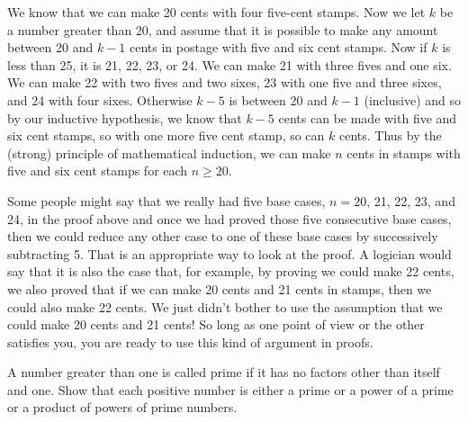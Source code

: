 We know that  we can make 20 cents
with four five-cent stamps.  Now we let $k$ be a number greater than 20,
and assume that it is possible to make any amount between 20 and $k-1$
cents in postage with five and six cent stamps.  Now if $k$ is less than
25, it is 21, 22, 23, or 24.  We can make 21 with three fives and one
six.  We can make 22 with two fives and two sixes, 23 with one five and
three sixes, and 24 with four sixes.  Otherwise $k-5$ is  between 20 and
$k-1$ (inclusive) and so by our inductive hypothesis, we know that $k-5$
cents can be made with five and six cent stamps, so with one more five
cent stamp, so can $k$ cents.  Thus by the (strong) principle of
mathematical induction, we can make $n$ cents in stamps with five and six
cent stamps for each $n\ge 20$.

Some people might say that we really
had five base cases,
$n=20$, 21, 22, 23, and 24, in the proof above and once we had proved
those five consecutive base cases, then we could reduce any other case to
one of these base cases by successively subtracting 5.  That is an
appropriate way to look at the proof.  A logician would say that it
is also the case that, for example, by proving we could make 22 cents, we
also proved that if we can make 20 cents and 21 cents in stamps, then we
could also make 22 cents.  We just didn't bother to use the assumption
that we could make 20 cents and 21 cents!  So long as one point of view
or the other satisfies you, you are ready to use this kind of argument in
proofs.


\bp
\item A number greater than one is called prime if it has no factors other
than itself and one. Show that each positive number is either a prime or
a power of a prime or a product of powers of prime numbers.

